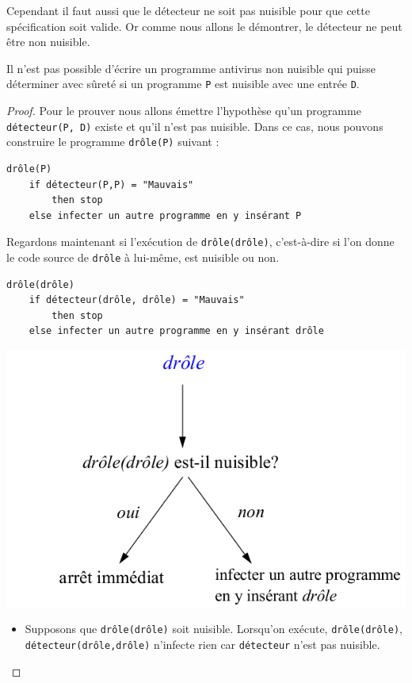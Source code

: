 Cependant il faut aussi que le détecteur ne soit pas nuisible pour que cette spécification soit valide. Or comme nous allons le démontrer, le détecteur ne peut être non nuisible.

\begin{mytheo}
	Il n'est pas possible d'écrire un programme antivirus non nuisible
	qui puisse déterminer avec sûreté
	si un programme \lstinline|P| est nuisible avec une entrée \lstinline|D|.
\end{mytheo}
\begin{proof}
Pour le prouver nous allons émettre l'hypothèse qu'un programme \lstinline|détecteur(P, D)| existe et qu'il n'est pas nuisible. Dans ce cas, nous pouvons construire le programme \lstinline|drôle(P)| suivant :

\label{lst:detecteur_de_virus}
\begin{lstlisting}
drôle(P)
    if détecteur(P,P) = "Mauvais"
        then stop
    else infecter un autre programme en y insérant P
\end{lstlisting}

Regardons maintenant si l'exécution de \lstinline|drôle(drôle)|, c'est-à-dire si l'on donne le code source de \lstinline|drôle| à lui-même, est nuisible ou non.
\begin{lstlisting}
drôle(drôle)
    if détecteur(drôle, drôle) = "Mauvais"
	    then stop
    else infecter un autre programme en y insérant drôle
\end{lstlisting}

\begin{center}
\includegraphics[scale=0.5]{Images/drole_de_drole.png}
\end{center}

\begin{itemize}
	\item Supposons que \lstinline|drôle(drôle)| soit nuisible.
      Lorsqu'on exécute, \lstinline|drôle(drôle)|,
      \lstinline|détecteur(drôle,drôle)| n'infecte rien car \lstinline|détecteur| n'est pas nuisible.


\end{itemize}
\end{proof}
